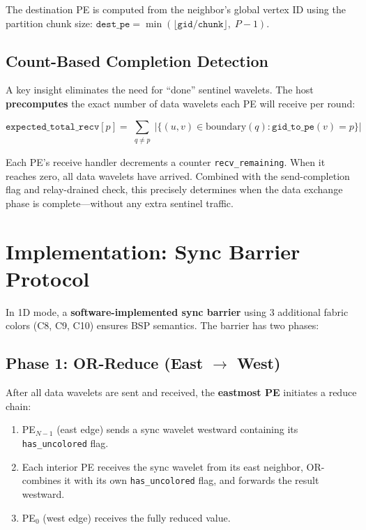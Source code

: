 \documentclass[11pt,letterpaper]{article}
\begin{document}
The destination PE is computed from the neighbor's global vertex ID using the partition chunk size: $\texttt{dest\_pe} = \min(\lfloor \texttt{gid} / \texttt{chunk} \rfloor,\; P{-}1)$.

\subsection{Count-Based Completion Detection}

A key insight eliminates the need for ``done'' sentinel wavelets. The host \textbf{precomputes} the exact number of data wavelets each PE will receive per round:

\[
  \texttt{expected\_total\_recv}[p] = \sum_{\substack{q \neq p}} \bigl|\{(u,v) \in \text{boundary}(q) : \texttt{gid\_to\_pe}(v) = p\}\bigr|
\]

Each PE's receive handler decrements a counter \texttt{recv\_remaining}. When it reaches zero, all data wavelets have arrived. Combined with the send-completion flag and relay-drained check, this precisely determines when the data exchange phase is complete---without any extra sentinel traffic.

\section{Implementation: Sync Barrier Protocol}
\label{sec:sync-impl}

In 1D mode, a \textbf{software-implemented sync barrier} using 3 additional fabric colors (C8, C9, C10) ensures BSP semantics. The barrier has two phases:

\subsection{Phase 1: OR-Reduce (East $\to$ West)}

After all data wavelets are sent and received, the \textbf{eastmost PE} initiates a reduce chain:

\begin{enumerate}[nosep]
  \item PE$_{N-1}$ (east edge) sends a sync wavelet westward containing its \texttt{has\_uncolored} flag.
  \item Each interior PE receives the sync wavelet from its east neighbor, OR-combines it with its own \texttt{has\_uncolored} flag, and forwards the result westward.
  \item PE$_0$ (west edge) receives the fully reduced value.
\end{enumerate}
\end{document}
